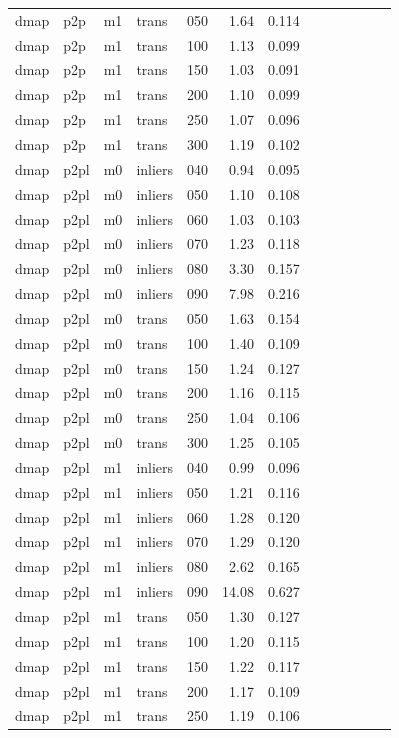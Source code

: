 \begin{table}[htbp]
\begin{tabular}{lllllrrrrrrrr}
  dmap & p2p & m1 & trans & 050 & 1.64 & 0.114 \\
  dmap & p2p & m1 & trans & 100 & 1.13 & 0.099 \\
  dmap & p2p & m1 & trans & 150 & 1.03 & 0.091 \\
  dmap & p2p & m1 & trans & 200 & 1.10 & 0.099 \\
  dmap & p2p & m1 & trans & 250 & 1.07 & 0.096 \\
  dmap & p2p & m1 & trans & 300 & 1.19 & 0.102 \\
  dmap & p2pl & m0 & inliers & 040 & 0.94 & 0.095 \\
  dmap & p2pl & m0 & inliers & 050 & 1.10 & 0.108 \\
  dmap & p2pl & m0 & inliers & 060 & 1.03 & 0.103 \\
  dmap & p2pl & m0 & inliers & 070 & 1.23 & 0.118 \\
  dmap & p2pl & m0 & inliers & 080 & 3.30 & 0.157 \\
  dmap & p2pl & m0 & inliers & 090 & 7.98 & 0.216 \\
  dmap & p2pl & m0 & trans & 050 & 1.63 & 0.154 \\
  dmap & p2pl & m0 & trans & 100 & 1.40 & 0.109 \\
  dmap & p2pl & m0 & trans & 150 & 1.24 & 0.127 \\
  dmap & p2pl & m0 & trans & 200 & 1.16 & 0.115 \\
  dmap & p2pl & m0 & trans & 250 & 1.04 & 0.106 \\
  dmap & p2pl & m0 & trans & 300 & 1.25 & 0.105 \\
  dmap & p2pl & m1 & inliers & 040 & 0.99 & 0.096 \\
  dmap & p2pl & m1 & inliers & 050 & 1.21 & 0.116 \\
  dmap & p2pl & m1 & inliers & 060 & 1.28 & 0.120 \\
  dmap & p2pl & m1 & inliers & 070 & 1.29 & 0.120 \\
  dmap & p2pl & m1 & inliers & 080 & 2.62 & 0.165 \\
  dmap & p2pl & m1 & inliers & 090 & 14.08 & 0.627 \\
  dmap & p2pl & m1 & trans & 050 & 1.30 & 0.127 \\
  dmap & p2pl & m1 & trans & 100 & 1.20 & 0.115 \\
  dmap & p2pl & m1 & trans & 150 & 1.22 & 0.117 \\
  dmap & p2pl & m1 & trans & 200 & 1.17 & 0.109 \\
  dmap & p2pl & m1 & trans & 250 & 1.19 & 0.106 \\

\end{tabular}
\end{table}

